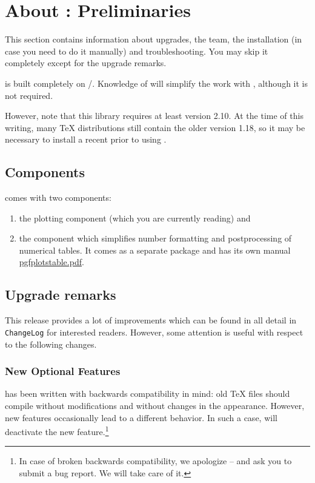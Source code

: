 
\chapter[About PGFPlots: Preliminaries]{About {\normalfont\PGFPlots{}}: Preliminaries}

This section contains information about upgrades, the team, the installation
(in case you need to do it manually) and troubleshooting. You may skip it
completely except for the upgrade remarks.

\PGFPlots{} is built completely on \Tikz{}/\PGF{}. Knowledge of \Tikz{} will
simplify the work with \PGFPlots{}, although it is not required.

However, note that this library requires at least \PGF{} version 2.10. At the
time of this writing, many \TeX{} distributions still contain the older \PGF{}
version 1.18, so it may be necessary to install a recent \PGF{} prior to using
\PGFPlots{}.


\section{Components}

\PGFPlots{} comes with two components:
%
\begin{enumerate}
    \item the plotting component (which you are currently reading) and
    \item the \PGFPlotstable{} component which simplifies number formatting
        and postprocessing of numerical tables. It comes as a separate
        package and has its own manual
        \href{file:pgfplotstable.pdf}{pgfplotstable.pdf}.
\end{enumerate}


\section{Upgrade remarks}

This release provides a lot of improvements which can be found in all detail in
\texttt{ChangeLog} for interested readers. However, some attention is useful
with respect to the following changes.


\subsection{New Optional Features}

\PGFPlots{} has been written with backwards compatibility in mind: old \TeX{}
files should compile without modifications and without changes in the
appearance. However, new features occasionally lead to a different behavior. In
such a case, \PGFPlots{} will deactivate the new feature.\footnote{In case of
broken backwards compatibility, we apologize -- and ask you to submit a bug
report. We will take care of it.}

